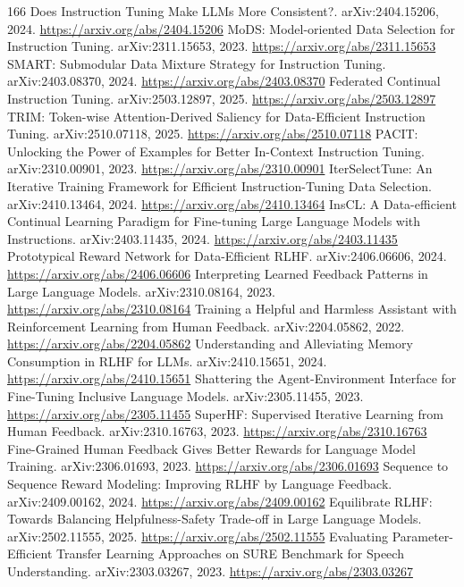 \documentclass[11pt]{article}
\begin{document}
\begin{thebibliography}{166}
 Does Instruction Tuning Make LLMs More Consistent?. arXiv:2404.15206, 2024. \url{https://arxiv.org/abs/2404.15206}
 MoDS: Model-oriented Data Selection for Instruction Tuning. arXiv:2311.15653, 2023. \url{https://arxiv.org/abs/2311.15653}
 SMART: Submodular Data Mixture Strategy for Instruction Tuning. arXiv:2403.08370, 2024. \url{https://arxiv.org/abs/2403.08370}
 Federated Continual Instruction Tuning. arXiv:2503.12897, 2025. \url{https://arxiv.org/abs/2503.12897}
 TRIM: Token-wise Attention-Derived Saliency for Data-Efficient Instruction Tuning. arXiv:2510.07118, 2025. \url{https://arxiv.org/abs/2510.07118}
 PACIT: Unlocking the Power of Examples for Better In-Context Instruction Tuning. arXiv:2310.00901, 2023. \url{https://arxiv.org/abs/2310.00901}
 IterSelectTune: An Iterative Training Framework for Efficient Instruction-Tuning Data Selection. arXiv:2410.13464, 2024. \url{https://arxiv.org/abs/2410.13464}
 InsCL: A Data-efficient Continual Learning Paradigm for Fine-tuning Large Language Models with Instructions. arXiv:2403.11435, 2024. \url{https://arxiv.org/abs/2403.11435}
 Prototypical Reward Network for Data-Efficient RLHF. arXiv:2406.06606, 2024. \url{https://arxiv.org/abs/2406.06606}
 Interpreting Learned Feedback Patterns in Large Language Models. arXiv:2310.08164, 2023. \url{https://arxiv.org/abs/2310.08164}
 Training a Helpful and Harmless Assistant with Reinforcement Learning from Human Feedback. arXiv:2204.05862, 2022. \url{https://arxiv.org/abs/2204.05862}
 Understanding and Alleviating Memory Consumption in RLHF for LLMs. arXiv:2410.15651, 2024. \url{https://arxiv.org/abs/2410.15651}
 Shattering the Agent-Environment Interface for Fine-Tuning Inclusive Language Models. arXiv:2305.11455, 2023. \url{https://arxiv.org/abs/2305.11455}
 SuperHF: Supervised Iterative Learning from Human Feedback. arXiv:2310.16763, 2023. \url{https://arxiv.org/abs/2310.16763}
 Fine-Grained Human Feedback Gives Better Rewards for Language Model Training. arXiv:2306.01693, 2023. \url{https://arxiv.org/abs/2306.01693}
 Sequence to Sequence Reward Modeling: Improving RLHF by Language Feedback. arXiv:2409.00162, 2024. \url{https://arxiv.org/abs/2409.00162}
 Equilibrate RLHF: Towards Balancing Helpfulness-Safety Trade-off in Large Language Models. arXiv:2502.11555, 2025. \url{https://arxiv.org/abs/2502.11555}
 Evaluating Parameter-Efficient Transfer Learning Approaches on SURE Benchmark for Speech Understanding. arXiv:2303.03267, 2023. \url{https://arxiv.org/abs/2303.03267}

\end{thebibliography}
\end{document}

